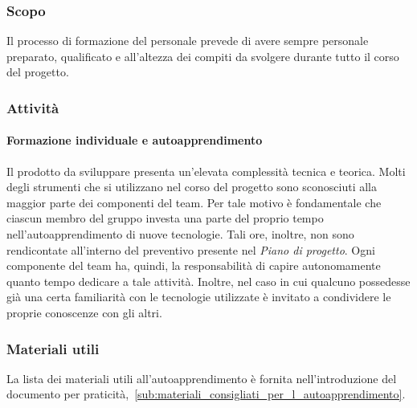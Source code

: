 \documentclass[../../norme-di-progetto.tex]{subfiles}
\begin{document}
\subsubsection{Scopo}%
\label{subs:formazione_del_personale/scopo}

Il processo di formazione del personale prevede di avere sempre personale preparato, qualificato e all'altezza dei compiti da svolgere durante tutto il corso del progetto.

\subsubsection{Attività}%
\label{subs:formazione_del_personale/attivita}

\paragraph{Formazione individuale e autoapprendimento}%
\label{par:formazione_individuale_e_autoapprendimento}

Il prodotto da sviluppare presenta un'elevata complessità tecnica e teorica.
Molti degli strumenti che si utilizzano nel corso del progetto sono sconosciuti alla maggior parte dei componenti del team.
Per tale motivo è fondamentale che ciascun membro del gruppo investa una parte del proprio tempo nell'autoapprendimento di nuove tecnologie.
Tali ore, inoltre, non sono rendicontate all'interno del preventivo presente nel \textit{Piano di progetto}.
Ogni componente del team ha, quindi, la responsabilità di capire autonomamente quanto tempo dedicare a tale attività.
Inoltre, nel caso in cui qualcuno possedesse già una certa familiarità con le tecnologie utilizzate è invitato a condividere le proprie conoscenze con gli altri.

\subsubsection{Materiali utili}%
\label{subs:materiali_utili}

La lista dei materiali utili all'autoapprendimento è fornita nell'introduzione del documento per praticità,~\ref{sub:materiali_consigliati_per_l_autoapprendimento}.
\end{document}
